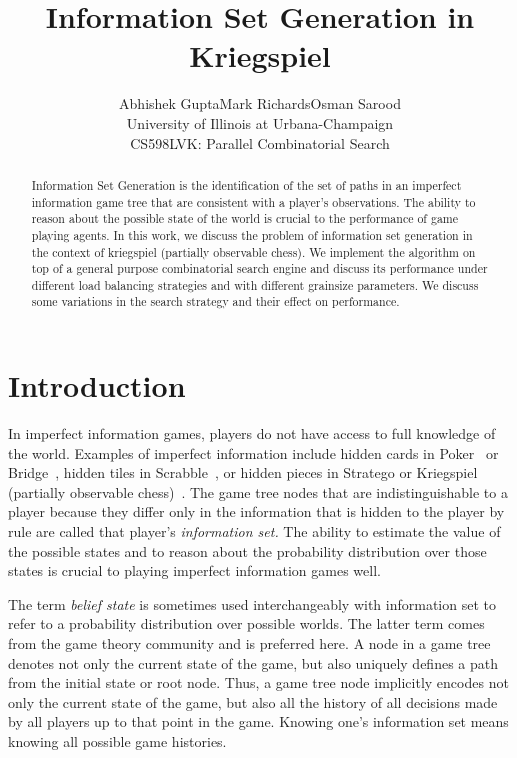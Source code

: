 \documentclass[11pt]{article}
\begin{document}
\title{Information Set Generation in Kriegspiel}
\author{Abhishek Gupta\qquad Mark Richards\qquad Osman Sarood\\University of Illinois at Urbana-Champaign\\CS598LVK:
Parallel Combinatorial Search} \maketitle

\begin{abstract}
Information Set Generation is the identification of the set of paths in an imperfect information game tree that are
consistent with a player's observations.  The ability to reason about the possible state of the world is crucial to the
performance of game playing agents.  In this work, we discuss the problem of information set generation in the context
of kriegspiel (partially observable chess).  We implement the algorithm on top of a general purpose combinatorial search
engine and discuss its performance under different load balancing strategies and with different grainsize parameters.
We discuss some variations in the search strategy and their effect on performance.  \end{abstract}

\section{Introduction}
In imperfect information games, players do not have access to full knowledge of the world. Examples of imperfect
information include hidden cards in Poker~\cite{billings02challenge} or Bridge~\cite{ginsberg96partition}, hidden tiles
in Scrabble~\cite{richards07opponent}, or hidden pieces in Stratego or Kriegspiel (partially observable
chess)~\cite{li94chess}. The game tree nodes that are indistinguishable to a player because they differ only in the
information that is hidden to the player by rule are called that player's {\em information set.}  The ability to
estimate the value of the possible states and to reason about the probability distribution over those states is crucial
to playing imperfect information games well. 

The term {\em belief state} is sometimes used interchangeably with information set to refer to a probability
distribution over possible worlds.  The latter term comes from the game theory community and is preferred here.  A node
in a game tree denotes not only the current state of the game, but also uniquely defines a path from the initial state
or root node.  Thus, a game tree node implicitly encodes not only the current state of the game, but also all the
history of all decisions made by all players up to that point in the game.  Knowing one's information set means knowing
all possible game histories.
\end{document}
